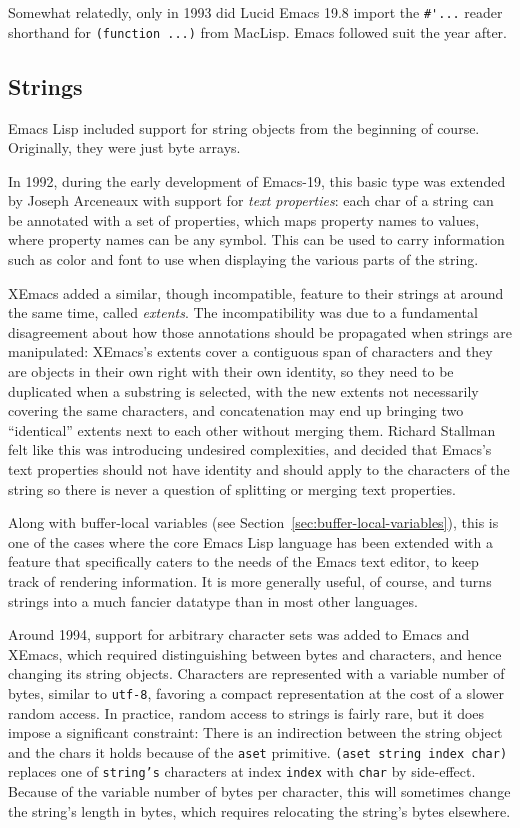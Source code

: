 \documentclass[format=acmsmall, review]{acmart}
\newcommand \Elisp {Emacs Lisp}
\begin{document}
Somewhat relatedly, only in 1993 did Lucid Emacs 19.8 import the
\verb|#'...| reader shorthand for \texttt{(function ...)} from MacLisp.
Emacs followed suit the year after.

\subsection{Strings}
\label{sec:strings}

\Elisp{} included support for string objects from the beginning of course.
Originally, they were just byte arrays.

In 1992, during the early development of Emacs-19, this basic type was
extended by Joseph Arceneaux with support for \emph{text properties}: each
char of a string can be annotated with a set of properties, which maps
property names to values, where property names can be any symbol.  This can
be used to carry information such as color and font to use when displaying
the various parts of the string.

XEmacs added a similar, though incompatible, feature to their strings at
around the same time, called \emph{extents}.  The incompatibility was due to
a fundamental disagreement about how those annotations should be propagated
when strings are manipulated: XEmacs's extents cover a contiguous span of
characters and they are objects in their own right with their own identity,
so they need to be duplicated when a substring is selected, with the new
extents not necessarily covering the same characters, and concatenation may
end up bringing two ``identical'' extents next to each other 
without merging them.  Richard Stallman felt like this was introducing
undesired complexities, and decided that Emacs's text properties should not
have identity and should apply to the characters of the string so there is
never a question of splitting or merging text properties.

Along with buffer-local variables (see Section~\ref{sec:buffer-local-variables}), this is one of
the cases where the core \Elisp{} language has been extended with
a feature that specifically caters to the needs of the Emacs text editor, to
keep track of rendering information.  It is more generally useful, of
course, and turns strings into a much fancier datatype than in most
other languages.

Around 1994, support for arbitrary character sets was added to Emacs and
XEmacs, which required distinguishing between bytes and characters, and
hence changing its string objects.  Characters are represented with
a variable number of bytes, similar to \texttt{utf-8}, favoring a compact
representation at the cost of a slower random access.  In practice, random
access to strings is fairly rare, but it does
impose a significant constraint: There is an indirection between the string
object and the chars it holds because of the \texttt{aset} primitive.
\texttt{(aset string index char)}
replaces one of \texttt{string's} characters at index \texttt{index}
with \texttt{char} by side-effect.  Because of the variable number of bytes
per character, this will
sometimes change the string's length in bytes, which requires relocating
the string's bytes elsewhere.
\end{document}
